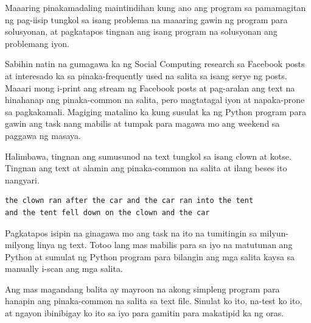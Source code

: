 \documentclass[10pt,]{book}
\begin{document}
Maaaring pinakamadaling maintindihan kung ano ang program sa pamamagitan
ng pag-iisip tungkol sa isang problema na maaaring gawin ng program para
solusyonan, at pagkatapos tingnan ang isang program na solusyonan ang
problemang iyon.

Sabihin natin na gumagawa ka ng Social Computing research sa Facebook
posts at interesado ka sa pinaka-frequently used na salita sa isang
serye ng posts. Maaari mong i-print ang stream ng Facebook posts at
pag-aralan ang text na hinahanap ang pinaka-common na salita, pero
magtatagal iyon at napaka-prone sa pagkakamali. Magiging matalino ka
kung susulat ka ng Python program para gawin ang task nang mabilis at
tumpak para magawa mo ang weekend sa paggawa ng masaya.

Halimbawa, tingnan ang sumusunod na text tungkol sa isang clown at
kotse. Tingnan ang text at alamin ang pinaka-common na salita at ilang
beses ito nangyari.

{\small
\begin{verbatim}
the clown ran after the car and the car ran into the tent
and the tent fell down on the clown and the car
\end{verbatim}
}

Pagkatapos isipin na ginagawa mo ang task na ito na tumitingin sa
milyun-milyong linya ng text. Totoo lang mas mabilis para sa iyo na
matutunan ang Python at sumulat ng Python program para bilangin ang mga
salita kaysa sa manually i-scan ang mga salita.

Ang mas magandang balita ay mayroon na akong simpleng program para
hanapin ang pinaka-common na salita sa text file. Sinulat ko ito,
na-test ko ito, at ngayon ibinibigay ko ito sa iyo para gamitin para
makatipid ka ng oras.
\end{document}
